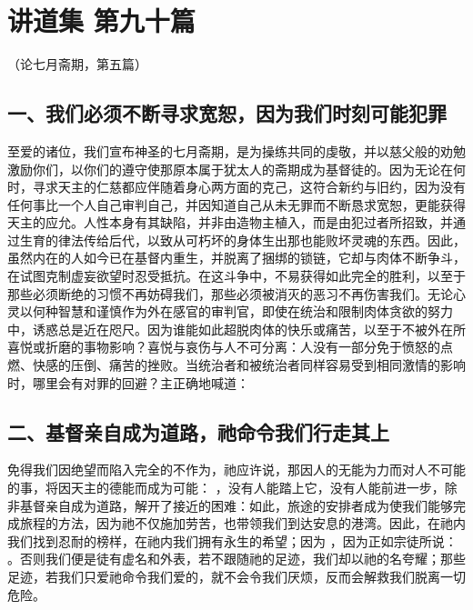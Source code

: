 

\section{讲道集 第九十篇}

（论七月斋期，第五篇）\par


\subsection{一、我们必须不断寻求宽恕，因为我们时刻可能犯罪}

至爱的诸位，我们宣布神圣的七月斋期，是为操练共同的虔敬，并以慈父般的劝勉激励你们，以你们的遵守使那原本属于犹太人的斋期成为基督徒的。因为无论在何时，寻求天主的仁慈都应伴随着身心两方面的克己，这符合新约与旧约，因为没有任何事比一个人自己审判自己，并因知道自己从未无罪而不断恳求宽恕，更能获得天主的应允。人性本身有其缺陷，并非由造物主植入，而是由犯过者所招致，并通过生育的律法传给后代，以致从可朽坏的身体生出那也能败坏灵魂的东西。因此，虽然内在的人如今已在基督内重生，并脱离了捆绑的锁链，它却与肉体不断争斗，在试图克制虚妄欲望时忍受抵抗。在这斗争中，不易获得如此完全的胜利，以至于那些必须断绝的习惯不再妨碍我们，那些必须被消灭的恶习不再伤害我们。无论心灵以何种智慧和谨慎作为外在感官的审判官，即使在统治和限制肉体贪欲的努力中，诱惑总是近在咫尺。因为谁能如此超脱肉体的快乐或痛苦，以至于不被外在所喜悦或折磨的事物影响？喜悦与哀伤与人不可分离：人没有一部分免于愤怒的点燃、快感的压倒、痛苦的挫败。当统治者和被统治者同样容易受到相同激情的影响时，哪里会有对罪的回避？主正确地喊道：\par


\subsection{二、基督亲自成为道路，祂命令我们行走其上}

免得我们因绝望而陷入完全的不作为，祂应许说，那因人的无能为力而对人不可能的事，将因天主的德能而成为可能：  ，没有人能踏上它，没有人能前进一步，除非基督亲自成为道路，解开了接近的困难：如此，旅途的安排者成为使我们能够完成旅程的方法，因为祂不仅施加劳苦，也带领我们到达安息的港湾。因此，在祂内我们找到忍耐的榜样，在祂内我们拥有永生的希望；因为  ，因为正如宗徒所说：  。否则我们便是徒有虚名和外表，若不跟随祂的足迹，我们却以祂的名夸耀；那些足迹，若我们只爱祂命令我们爱的，就不会令我们厌烦，反而会解救我们脱离一切危险。\par

